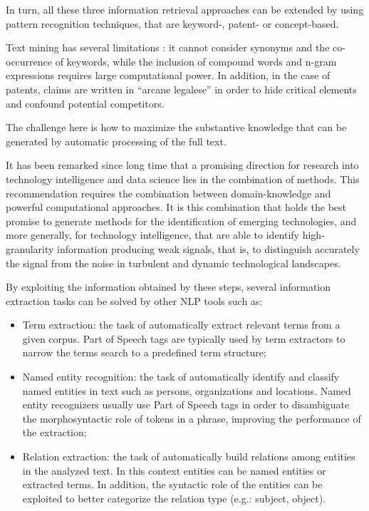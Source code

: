 \documentclass[]{book}
\theoremstyle{definition}
\theoremstyle{definition}
\theoremstyle{definition}
\theoremstyle{remark}
\begin{document}
In turn, all these three information retrieval approaches can be
extended by using pattern recognition techniques, that are keyword-,
patent- or concept-based.

Text mining has several limitations : it cannot consider synonyms and
the co-occurrence of keywords, while the inclusion of compound words and
n-gram expressions requires large computational power. In addition, in
the case of patents, claims are written in ``arcane legalese'' in order
to hide critical elements and confound potential competitors.

The challenge here is how to maximize the substantive knowledge that can
be generated by automatic processing of the full text.

It has been remarked since long time that a promising direction for
research into technology intelligence and data science lies in the
combination of methods. This recommendation requires the combination
between domain-knowledge and powerful computational approaches. It is
this combination that holds the best promise to generate methods for the
identification of emerging technologies, and more generally, for
technology intelligence, that are able to identify high-granularity
information producing weak signals, that is, to distinguish accurately
the signal from the noise in turbulent and dynamic technological
landscapes.

By exploiting the information obtained by these steps, several
information extraction tasks can be solved by other NLP tools such as:

\begin{itemize}
\item
  Term extraction: the task of automatically extract relevant terms from
  a given corpus. Part of Speech tags are typically used by term
  extractors to narrow the terms search to a predefined term structure;
\item
  Named entity recognition: the task of automatically identify and
  classify named entities in text such as persons, organizations and
  locations. Named entity recognizers usually use Part of Speech tags in
  order to disambiguate the morphosyntactic role of tokens in a phrase,
  improving the performance of the extraction;
\item
  Relation extraction: the task of automatically build relations among
  entities in the analyzed text. In this context entities can be named
  entities or extracted terms. In addition, the syntactic role of the
  entities can be exploited to better categorize the relation type
  (e.g.: subject, object).
\end{itemize}
\end{document}
